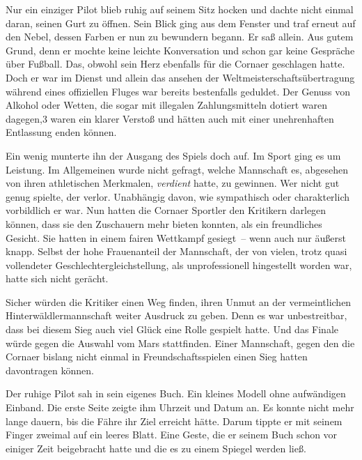 \par

Nur ein einziger Pilot blieb ruhig auf seinem Sitz hocken und dachte nicht einmal daran, seinen Gurt zu öffnen. Sein Blick ging aus dem Fenster und traf erneut auf den Nebel, dessen Farben er nun zu bewundern begann. Er saß allein. Aus gutem Grund, denn er mochte keine leichte Konversation und schon gar keine Gespräche über Fußball. Das, obwohl sein Herz ebenfalls für die Cornaer geschlagen hatte. Doch er war im Dienst und allein das ansehen der Weltmeisterschaftsübertragung während eines offiziellen Fluges war bereits bestenfalls geduldet. Der Genuss von Alkohol oder Wetten, die sogar mit illegalen Zahlungsmitteln dotiert waren dagegen,3 waren ein klarer Verstoß und hätten auch mit einer unehrenhaften Entlassung enden können.

\par

Ein wenig munterte ihn der Ausgang des Spiels doch auf. Im Sport ging es um Leistung. Im Allgemeinen wurde nicht gefragt, welche Mannschaft es, abgesehen von ihren athletischen Merkmalen, \textit{verdient} hatte, zu gewinnen. Wer nicht gut genug spielte, der verlor. Unabhängig davon, wie sympathisch oder charakterlich vorbildlich er war. Nun hatten die Cornaer Sportler den Kritikern darlegen können, dass sie den Zuschauern mehr bieten konnten, als ein freundliches Gesicht. Sie hatten in einem fairen Wettkampf gesiegt~-- wenn auch nur äußerst knapp. Selbst der hohe Frauenanteil der Mannschaft, der von vielen, trotz quasi vollendeter Geschlechtergleichstellung, als unprofessionell hingestellt worden war, hatte sich nicht gerächt.

\par

Sicher würden die Kritiker einen Weg finden, ihren Unmut an der vermeintlichen Hinterwäldlermannschaft weiter Ausdruck zu geben. Denn es war unbestreitbar, dass bei diesem Sieg auch viel Glück eine Rolle gespielt hatte. Und das Finale würde gegen die Auswahl vom Mars stattfinden. Einer Mannschaft, gegen den die Cornaer bislang nicht einmal in Freundschaftsspielen einen Sieg hatten davontragen können.

\par

Der ruhige Pilot sah in sein eigenes Buch. Ein kleines Modell ohne aufwändigen Einband. Die erste Seite zeigte ihm Uhrzeit und Datum an. Es konnte nicht mehr lange dauern, bis die Fähre ihr Ziel erreicht hätte. Darum tippte er mit seinem Finger zweimal auf ein leeres Blatt. Eine Geste, die er seinem Buch schon vor einiger Zeit beigebracht hatte und die es zu einem Spiegel werden ließ.

